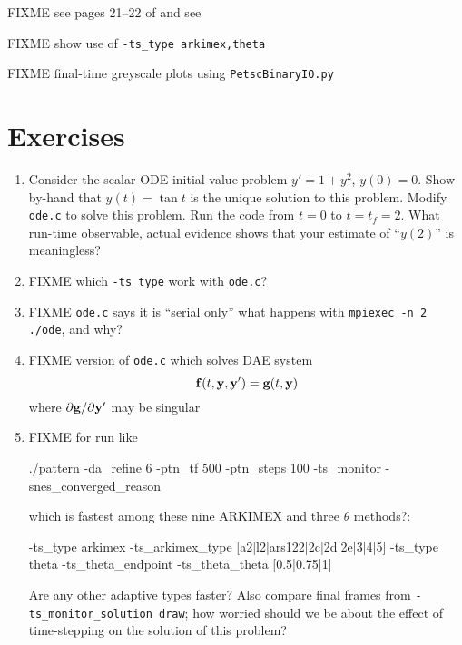FIXME see pages 21--22 of \citep{HundsdorferVerwer2003} and see \citep{Pearson1993}






FIXME show use of \texttt{-ts\_type arkimex,theta}

FIXME final-time greyscale plots using \texttt{PetscBinaryIO.py}


\section{Exercises}

\renewcommand{\labelenumi}{\arabic{chapter}.\arabic{enumi}\quad}
\renewcommand{\labelenumii}{(\alph{enumii})}
\begin{enumerate}
\item \label{exer:ts:tan}  Consider the scalar ODE initial value problem $y'=1+y^2$, $y(0)=0$.  Show by-hand that $y(t)=\tan t$ is the unique solution to this problem.  Modify \texttt{ode.c} to solve this problem.  Run the code from $t=0$ to $t=t_f=2$.  What run-time observable, actual evidence shows that your estimate of ``$y(2)$'' is meaningless?
\item FIXME which \texttt{-ts\_type} work with \texttt{ode.c}?
\item FIXME \texttt{ode.c} says it is ``serial only''  what happens with \texttt{mpiexec -n 2 ./ode}, and why?
\item FIXME version of \texttt{ode.c} which solves DAE system
    $$\mathbf{f}(t,\mathbf{y},\mathbf{y}') = \mathbf{g}(t,\mathbf{y})$$
where $\partial \mathbf{g}/\partial \mathbf{y}'$ may be singular
\item FIXME for run like
\begin{cline}
./pattern -da_refine 6 -ptn_tf 500 -ptn_steps 100 -ts_monitor -snes_converged_reason
\end{cline}
which is fastest among these nine ARKIMEX and three $\theta$ methods?:
\begin{code}
-ts_type arkimex -ts_arkimex_type [a2|l2|ars122|2c|2d|2e|3|4|5]
-ts_type theta -ts_theta_endpoint -ts_theta_theta [0.5|0.75|1]
\end{code}
Are any other adaptive \pTS types faster?  Also compare final frames from \texttt{-ts\_monitor\_solution draw}; how worried should we be about the effect of time-stepping on the solution of this problem?
\end{enumerate}
